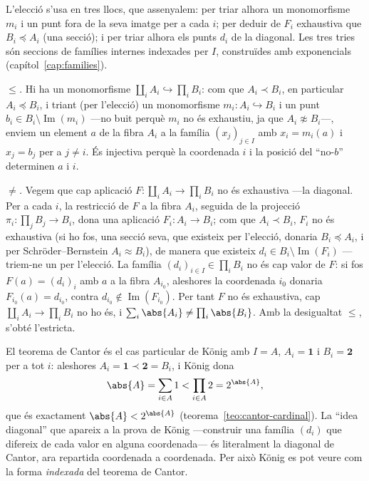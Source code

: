 \begin{prova}
L'elecció s'usa en tres llocs, que assenyalem: per triar alhora un
monomorfisme \(m_i\) i un punt fora de la seva imatge per a cada \(i\); per
deduir de \(F_i\) exhaustiva que \(B_i\preceq A_i\) (una secció); i per triar
alhora els punts \(d_i\) de la diagonal. Les tres tries són seccions de
famílies internes indexades per \(I\), construïdes amb exponencials
(capítol~\ref{cap:families}).

\emph{\(\le\).} Hi ha un monomorfisme \(\coprod_i A_i\hookrightarrow\prod_i B_i\):
com que \(A_i\prec B_i\), en particular \(A_i\preceq B_i\), i triant (per
l'elecció) un monomorfisme \(m_i\colon A_i\hookrightarrow B_i\) i un punt
\(b_i\in B_i\setminus\operatorname{Im}(m_i)\) ---no buit perquè \(m_i\) no és
exhaustiu, ja que \(A_i\not\approx B_i\)---, enviem un element \(a\) de la
fibra \(A_i\) a la família \((x_j)_{j\in I}\) amb \(x_i=m_i(a)\) i \(x_j=b_j\)
per a \(j\neq i\). És injectiva perquè la coordenada \(i\) i la posició del
\enquote{no-\(b\)} determinen \(a\) i \(i\).

\emph{\(\neq\).} Vegem que cap aplicació \(F\colon\coprod_i A_i\to\prod_i B_i\)
no és exhaustiva ---la diagonal. Per a cada \(i\), la restricció de \(F\) a la
fibra \(A_i\), seguida de la projecció \(\pi_i\colon\prod_j B_j\to B_i\), dona
una aplicació \(F_i\colon A_i\to B_i\); com que \(A_i\prec B_i\), \(F_i\) no és
exhaustiva (si ho fos, una secció seva, que existeix per l'elecció, donaria
\(B_i\preceq A_i\), i per Schröder--Bernstein \(A_i\approx B_i\)), de manera que existeix
\(d_i\in B_i\setminus\operatorname{Im}(F_i)\) ---triem-ne un per l'elecció. La
família \((d_i)_{i\in I}\in\prod_i B_i\) no és cap valor de \(F\): si fos
\(F(a)=(d_i)_i\) amb \(a\) a la fibra \(A_{i_0}\), aleshores la coordenada
\(i_0\) donaria \(F_{i_0}(a)=d_{i_0}\), contra \(d_{i_0}\notin\operatorname{Im}(F_{i_0})\).
Per tant \(F\) no és exhaustiva, cap \(\coprod_i A_i\to\prod_i B_i\) no ho és,
i \(\sum_i\abs{A_i}\neq\prod_i\abs{B_i}\). Amb la desigualtat \(\le\), s'obté
l'estricta.
\end{prova}

\begin{observacio}\label{obs:konig-cantor}
El teorema de Cantor és el cas particular de König amb \(I=A\), \(A_i=\mathbf1\)
i \(B_i=\mathbf2\) per a tot \(i\): aleshores \(A_i=\mathbf1\prec\mathbf2=B_i\),
i König dona
\[
\abs{A}=\sum_{i\in A}1<\prod_{i\in A}2=2^{\abs{A}},
\]
que és exactament \(\abs{A}<2^{\abs{A}}\) (teorema~\ref{teo:cantor-cardinal}).
La \enquote{idea diagonal} que apareix a la prova de König ---construir una
família \((d_i)\) que difereix de cada valor en alguna coordenada--- és
literalment la diagonal de Cantor, ara repartida coordenada a coordenada. Per
això König es pot veure com la forma \emph{indexada} del teorema de Cantor.
\end{observacio}

